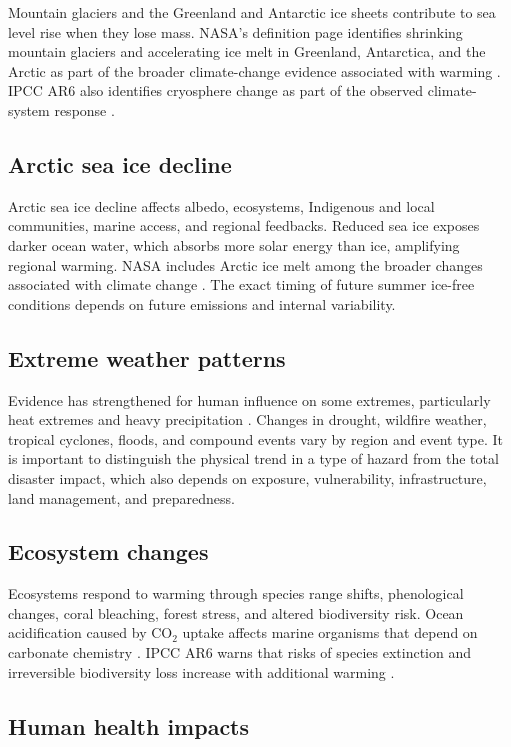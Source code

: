 \documentclass[12pt]{article}
\begin{document}
Mountain glaciers and the Greenland and Antarctic ice sheets contribute to sea level rise when they lose mass. NASA's definition page identifies shrinking mountain glaciers and accelerating ice melt in Greenland, Antarctica, and the Arctic as part of the broader climate-change evidence associated with warming \cite{ref2}. IPCC AR6 also identifies cryosphere change as part of the observed climate-system response \cite{ref1,ref6}.

\subsection{Arctic sea ice decline}

Arctic sea ice decline affects albedo, ecosystems, Indigenous and local communities, marine access, and regional feedbacks. Reduced sea ice exposes darker ocean water, which absorbs more solar energy than ice, amplifying regional warming. NASA includes Arctic ice melt among the broader changes associated with climate change \cite{ref2}. The exact timing of future summer ice-free conditions depends on future emissions and internal variability.

\subsection{Extreme weather patterns}

Evidence has strengthened for human influence on some extremes, particularly heat extremes and heavy precipitation \cite{ref1}. Changes in drought, wildfire weather, tropical cyclones, floods, and compound events vary by region and event type. It is important to distinguish the physical trend in a type of hazard from the total disaster impact, which also depends on exposure, vulnerability, infrastructure, land management, and preparedness.

\subsection{Ecosystem changes}

Ecosystems respond to warming through species range shifts, phenological changes, coral bleaching, forest stress, and altered biodiversity risk. Ocean acidification caused by CO$_2$ uptake affects marine organisms that depend on carbonate chemistry \cite{ref3}. IPCC AR6 warns that risks of species extinction and irreversible biodiversity loss increase with additional warming \cite{ref1}.

\subsection{Human health impacts}
\end{document}
